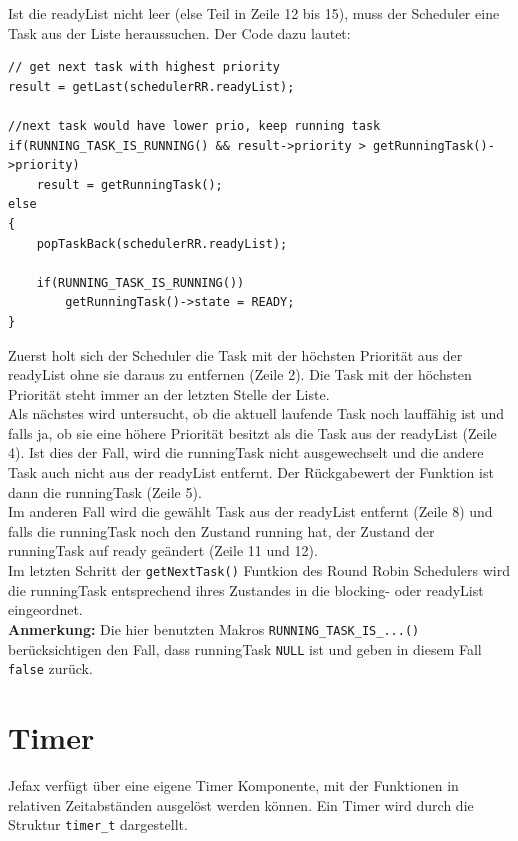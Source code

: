 \documentclass[fontsize=12pt, toc=bibliography, notitlepage]{scrreprt}
\begin{document}
Ist die readyList nicht leer (else Teil in Zeile 12 bis 15), muss der Scheduler eine Task aus der Liste heraussuchen. Der Code dazu lautet:

\begin{lstlisting}[title=schedulerRR.c]
// get next task with highest priority
result = getLast(schedulerRR.readyList);

//next task would have lower prio, keep running task
if(RUNNING_TASK_IS_RUNNING() && result->priority > getRunningTask()->priority)
	result = getRunningTask();
else
{
	popTaskBack(schedulerRR.readyList);
	
	if(RUNNING_TASK_IS_RUNNING())
		getRunningTask()->state = READY;
}
\end{lstlisting}

Zuerst holt sich der Scheduler die Task mit der höchsten Priorität aus der readyList ohne sie daraus zu entfernen (Zeile 2). Die Task mit der höchsten Priorität steht immer an der letzten Stelle der Liste.\\
Als nächstes wird untersucht, ob die aktuell laufende Task noch lauffähig ist und falls ja, ob sie eine höhere Priorität besitzt als die Task aus der readyList (Zeile 4). Ist dies der Fall, wird die runningTask nicht ausgewechselt und die andere Task auch nicht aus der readyList entfernt. Der Rückgabewert der Funktion ist dann die runningTask (Zeile 5).\\
Im anderen Fall wird die gewählt Task aus der readyList entfernt (Zeile 8) und falls die runningTask noch den Zustand running hat, der Zustand der runningTask auf ready geändert (Zeile 11 und 12).\\

Im letzten Schritt der \lstinline$getNextTask()$ Funtkion des Round Robin Schedulers wird die runningTask entsprechend ihres Zustandes in die blocking- oder readyList eingeordnet.\\

\textbf{Anmerkung:} Die hier benutzten Makros \lstinline$RUNNING_TASK_IS_...()$ berücksichtigen den Fall, dass runningTask \lstinline$NULL$ ist und geben in diesem Fall \lstinline$false$ zurück.

\chapter{Timer}
\label{chap:timer}
Jefax verfügt über eine eigene Timer Komponente, mit der Funktionen in relativen Zeitabständen ausgelöst werden können. Ein Timer wird durch die Struktur \lstinline$timer_t$ dargestellt.
\end{document}
